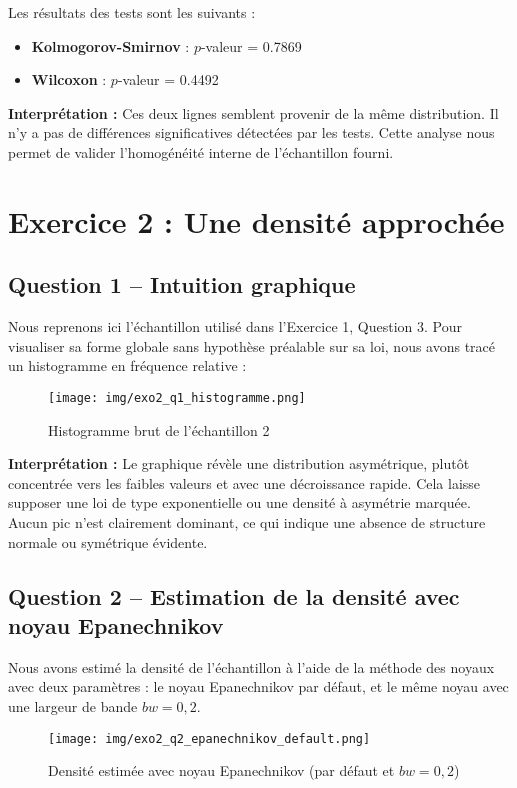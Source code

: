 \documentclass[a4paper,11pt]{article}
\begin{document}
Les résultats des tests sont les suivants :
\begin{itemize}
    \item \textbf{Kolmogorov-Smirnov} : $p$-valeur = 0.7869
    \item \textbf{Wilcoxon} : $p$-valeur = 0.4492
\end{itemize}

\textbf{Interprétation :} Ces deux lignes semblent provenir de la même distribution. Il n’y a pas de différences significatives détectées par les tests. Cette analyse nous permet de valider l’homogénéité interne de l’échantillon fourni.

\newpage

\section*{Exercice 2 : Une densité approchée}

\subsection*{Question 1 – Intuition graphique}
Nous reprenons ici l’échantillon utilisé dans l’Exercice 1, Question 3. Pour visualiser sa forme globale sans hypothèse préalable sur sa loi, nous avons tracé un histogramme en fréquence relative :

\begin{figure}[H]
    \centering
    \texttt{[image: img/exo2\_q1\_histogramme.png]}
    \caption{Histogramme brut de l’échantillon 2}
\end{figure}

\textbf{Interprétation :} Le graphique révèle une distribution asymétrique, plutôt concentrée vers les faibles valeurs et avec une décroissance rapide. Cela laisse supposer une loi de type exponentielle ou une densité à asymétrie marquée. Aucun pic n’est clairement dominant, ce qui indique une absence de structure normale ou symétrique évidente.

\subsection*{Question 2 – Estimation de la densité avec noyau Epanechnikov}
Nous avons estimé la densité de l’échantillon à l’aide de la méthode des noyaux avec deux paramètres : le noyau Epanechnikov par défaut, et le même noyau avec une largeur de bande $bw = 0{,}2$.

\begin{figure}[H]
    \centering
    \texttt{[image: img/exo2\_q2\_epanechnikov\_default.png]}
    \caption{Densité estimée avec noyau Epanechnikov (par défaut et $bw=0{,}2$)}
\end{figure}
\end{document}
